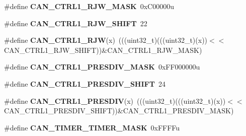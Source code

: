 \begin{DoxyCompactItemize}
\item 
\#define {\bfseries C\+A\+N\+\_\+\+C\+T\+R\+L1\+\_\+\+R\+J\+W\+\_\+\+M\+A\+SK}~0x\+C00000u\hypertarget{group__CAN__Register__Masks_ga10512d44b72e4fcf8fff8052dba9fd3a}{}\label{group__CAN__Register__Masks_ga10512d44b72e4fcf8fff8052dba9fd3a}

\item 
\#define {\bfseries C\+A\+N\+\_\+\+C\+T\+R\+L1\+\_\+\+R\+J\+W\+\_\+\+S\+H\+I\+FT}~22\hypertarget{group__CAN__Register__Masks_ga6fbcc0f866380f763269138136a2a92e}{}\label{group__CAN__Register__Masks_ga6fbcc0f866380f763269138136a2a92e}

\item 
\#define {\bfseries C\+A\+N\+\_\+\+C\+T\+R\+L1\+\_\+\+R\+JW}(x)~(((uint32\+\_\+t)(((uint32\+\_\+t)(x))$<$$<$C\+A\+N\+\_\+\+C\+T\+R\+L1\+\_\+\+R\+J\+W\+\_\+\+S\+H\+I\+FT))\&C\+A\+N\+\_\+\+C\+T\+R\+L1\+\_\+\+R\+J\+W\+\_\+\+M\+A\+SK)\hypertarget{group__CAN__Register__Masks_gaa54623c269b62894c35c88d10102f17b}{}\label{group__CAN__Register__Masks_gaa54623c269b62894c35c88d10102f17b}

\item 
\#define {\bfseries C\+A\+N\+\_\+\+C\+T\+R\+L1\+\_\+\+P\+R\+E\+S\+D\+I\+V\+\_\+\+M\+A\+SK}~0x\+F\+F000000u\hypertarget{group__CAN__Register__Masks_gad8d384c87d48a3fc0b1ae52949823818}{}\label{group__CAN__Register__Masks_gad8d384c87d48a3fc0b1ae52949823818}

\item 
\#define {\bfseries C\+A\+N\+\_\+\+C\+T\+R\+L1\+\_\+\+P\+R\+E\+S\+D\+I\+V\+\_\+\+S\+H\+I\+FT}~24\hypertarget{group__CAN__Register__Masks_ga762ed1bd89d4db4a6f34a12f8ae0afcf}{}\label{group__CAN__Register__Masks_ga762ed1bd89d4db4a6f34a12f8ae0afcf}

\item 
\#define {\bfseries C\+A\+N\+\_\+\+C\+T\+R\+L1\+\_\+\+P\+R\+E\+S\+D\+IV}(x)~(((uint32\+\_\+t)(((uint32\+\_\+t)(x))$<$$<$C\+A\+N\+\_\+\+C\+T\+R\+L1\+\_\+\+P\+R\+E\+S\+D\+I\+V\+\_\+\+S\+H\+I\+FT))\&C\+A\+N\+\_\+\+C\+T\+R\+L1\+\_\+\+P\+R\+E\+S\+D\+I\+V\+\_\+\+M\+A\+SK)\hypertarget{group__CAN__Register__Masks_ga984ade68da6423e2afc012f0979221d7}{}\label{group__CAN__Register__Masks_ga984ade68da6423e2afc012f0979221d7}

\item 
\#define {\bfseries C\+A\+N\+\_\+\+T\+I\+M\+E\+R\+\_\+\+T\+I\+M\+E\+R\+\_\+\+M\+A\+SK}~0x\+F\+F\+F\+Fu\hypertarget{group__CAN__Register__Masks_gaa7323a19c6c05a13fdf8489331e9671f}{}\label{group__CAN__Register__Masks_gaa7323a19c6c05a13fdf8489331e9671f}


\end{DoxyCompactItemize}
